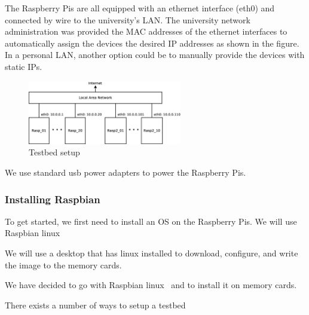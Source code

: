The Raspberry Pis are all equipped with an ethernet interface (eth0) and
connected by wire to the university's \ac{LAN}. The university network
administration was provided
the \ac{MAC} addresses of the ethernet interfaces to automatically assign
the devices the desired \ac{IP} addresses as shown in the figure. In a personal
\ac{LAN}, another option could be to manually provide the devices with static
\ac{IP}s.

\begin{figure}[ht!]
\centering
\includegraphics[width=0.6\textwidth]{images/testbed_setup.eps}
\caption{Testbed setup}
\label{fig:testbed_setup}
\end{figure}

We use standard usb power adapters to power the Raspberry Pis.

\subsubsection{Installing Raspbian}

To get started, we first need to install an \ac{OS} on the
Raspberry Pis. We will use Raspbian linux~\cite{raspbian}

We will use a desktop that has linux installed to download,
configure, and write the image to the memory cards.


We have decided to go with Raspbian linux~\cite{raspbian} and
to install it on memory cards.



There exists a number of ways to setup a testbed 

